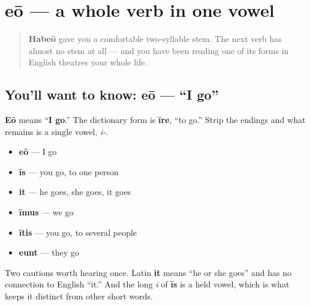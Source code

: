 \section[eō, īre]{eō — a whole verb in one vowel}

\label{lesson:LA-C37-eo}



\begin{quote}
\textbf{Habeō} gave you a comfortable two-syllable stem. The next verb has almost no stem at all — and you have been reading one of its forms in English theatres your whole life.
\end{quote}

\subsection*{You'll want to know: eō — \textquotedblleft{}I go\textquotedblright{}}
\textbf{Eō} means \textquotedblleft{}\textbf{I go}.\textquotedblright{} The dictionary form is \textbf{īre}, \textquotedblleft{}to go.\textquotedblright{} Strip the endings and what remains is a single vowel, \emph{i-}.

\begin{itemize}
\raggedright
  \item \textbf{eō} — I go
  \item \textbf{īs} — you go, to one person
  \item \textbf{it} — he goes, she goes, it goes
  \item \textbf{īmus} — we go
  \item \textbf{ītis} — you go, to several people
  \item \textbf{eunt} — they go
\end{itemize}

Two cautions worth hearing once. Latin \textbf{it} means \textquotedblleft{}he or she goes\textquotedblright{} and has no connection to English \textquotedblleft{}it.\textquotedblright{} And the long \emph{ī} of \textbf{īs} is a held vowel, which is what keeps it distinct from other short words.

